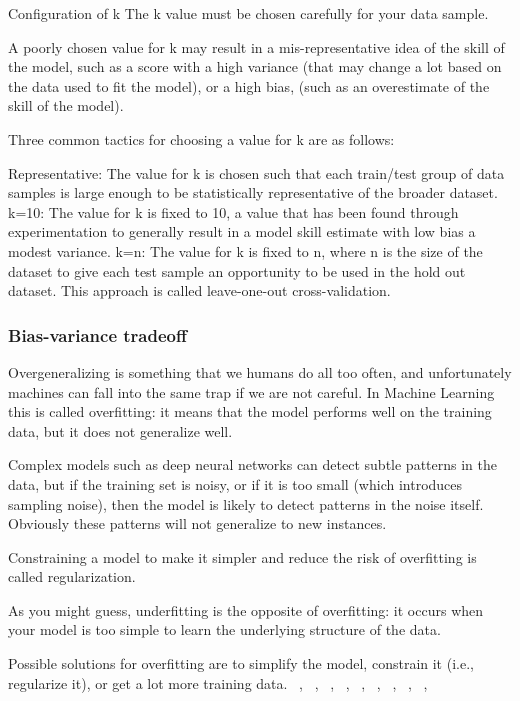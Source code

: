 Configuration of k
The k value must be chosen carefully for your data sample.

A poorly chosen value for k may result in a mis-representative idea of the skill of the model, such as a score with a high variance (that may change a lot based on the data used to fit the model), or a high bias, (such as an overestimate of the skill of the model).

Three common tactics for choosing a value for k are as follows:

Representative: The value for k is chosen such that each train/test group of data samples is large enough to be statistically representative of the broader dataset.
k=10: The value for k is fixed to 10, a value that has been found through experimentation to generally result in a model skill estimate with low bias a modest variance.
k=n: The value for k is fixed to n, where n is the size of the dataset to give each test sample an opportunity to be used in the hold out dataset. This approach is called leave-one-out cross-validation.

\subsubsection{Bias-variance tradeoff}
Overgeneralizing is something that we humans do all too often, and unfortunately machines can fall into the same trap if we are not careful. In Machine Learning this is called overfitting: it means that the model performs well on the training data, but it does not generalize well.

Complex models such as deep neural networks can detect subtle patterns in the data, but if the training set is noisy, or if it is too small (which introduces sampling noise), then the model is likely to detect patterns in the noise itself. Obviously these patterns will not generalize to new instances. 

Constraining a model to make it simpler and reduce the risk of overfitting is called regularization.

As you might guess, underfitting is the opposite of overfitting: it occurs when your model is too simple to learn the underlying structure of the data.



Possible solutions for overfitting are to simplify the model, constrain it (i.e., regularize it), or get a lot more training data.
\be{}
\, ,
\ee
\be{}
\, ,
\ee
\be{}
\, ,
\ee
\be{}
\, ,
\ee
\be{}
\, ,
\ee
\be{}
\, ,
\ee
\be{}
\, ,
\ee
\be{}
\, ,
\ee
\be{}
\, ,
\ee




